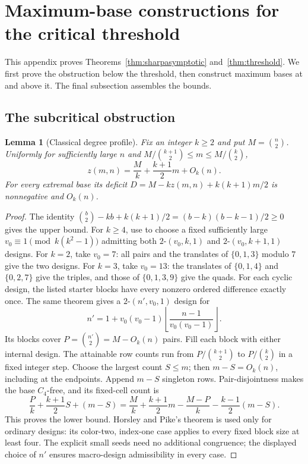 \documentclass[11pt]{article}
\newtheorem{lemma}[theorem]{Lemma}
\begin{document}
\appendix
\section{Maximum-base constructions for the critical threshold}\label{sec:constructions}
This appendix proves Theorems~\ref{thm:sharpasymptotic} and~\ref{thm:threshold}.
We first prove the obstruction below the threshold, then construct
maximum bases at and above it. The final subsection assembles the bounds.

\subsection{The subcritical obstruction}
\begin{lemma}[Classical degree profile]\label{lem:classicalprofile}
Fix an integer $k\ge2$ and put $M=\binom n2$. Uniformly for sufficiently large $n$
and $M/\binom{k+1}2\le m\le M/\binom k2$,
\[
 z(m,n)=\frac Mk+\frac{k+1}{2}m+O_k(n).
\]
For every extremal base its deficit
$D=M-kz(m,n)+k(k+1)m/2$ is nonnegative and $O_k(n)$.
\end{lemma}
\begin{proof}
The identity
$\binom b2-kb+k(k+1)/2=(b-k)(b-k-1)/2\ge0$ gives the upper bound.
For $k\ge4$, use \cite[Theorem~1.1]{designexistence} to choose a fixed sufficiently large
$v_0\equiv1\pmod{k(k^2-1)}$ admitting both $2$-$(v_0,k,1)$ and
$2$-$(v_0,k+1,1)$ designs. For $k=2$, take $v_0=7$: all pairs and
the translates of $\{0,1,3\}$ modulo $7$ give the two designs.
For $k=3$, take $v_0=13$: the translates of $\{0,1,4\}$ and
$\{0,2,7\}$ give the triples, and those of $\{0,1,3,9\}$ give the
quads. For each cyclic design, the listed starter blocks have every
nonzero ordered difference exactly once. The same theorem gives a $2$-$(n',v_0,1)$
design for
\[
 n'=1+v_0(v_0-1)\left\lfloor\frac{n-1}{v_0(v_0-1)}\right\rfloor.
\]
Its blocks cover $P=\binom{n'}2=M-O_k(n)$ pairs. Fill each block with
either internal design. The attainable row counts run from
$P/\binom{k+1}2$ to $P/\binom k2$ in a fixed integer step. Choose the
largest count $S\le m$; then $m-S=O_k(n)$, including at the endpoints.
Append $m-S$ singleton rows. Pair-disjointness makes the base $C_4$-free,
and its fixed-cell count is
\[
 \frac Pk+\frac{k+1}{2}S+(m-S)
 =\frac Mk+\frac{k+1}{2}m
   -\frac{M-P}{k}-\frac{k-1}{2}(m-S).
\]
This proves the lower bound. Horsley and Pike's theorem is used only
for ordinary designs: its color-two, index-one case applies to every
fixed block size at least four. The explicit small seeds need no
additional congruence; the displayed choice of $n'$ ensures macro-design
admissibility in every case.
\end{proof}
\end{document}
